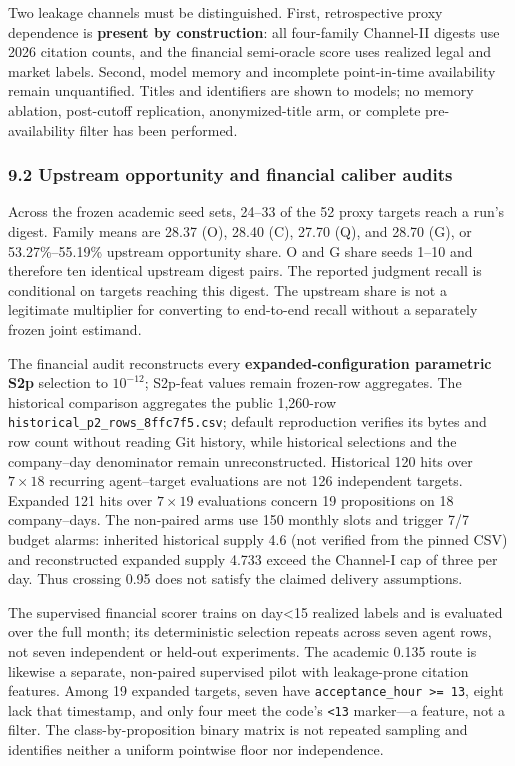 \documentclass[
  11pt]{article}
\begin{document}
Two leakage channels must be distinguished. First, retrospective proxy
dependence is \textbf{present by construction}: all four-family
Channel-II digests use 2026 citation counts, and the financial
semi-oracle score uses realized legal and market labels. Second, model
memory and incomplete point-in-time availability remain unquantified.
Titles and identifiers are shown to models; no memory ablation,
post-cutoff replication, anonymized-title arm, or complete
pre-availability filter has been performed.

\subsubsection{9.2 Upstream opportunity and financial caliber
audits}\label{upstream-opportunity-and-financial-caliber-audits}

Across the frozen academic seed sets, 24--33 of the 52 proxy targets
reach a run's digest. Family means are 28.37 (O), 28.40 (C), 27.70 (Q),
and 28.70 (G), or 53.27\%--55.19\% upstream opportunity share. O and G
share seeds 1--10 and therefore ten identical upstream digest pairs. The
reported judgment recall is conditional on targets reaching this digest.
The upstream share is not a legitimate multiplier for converting to
end-to-end recall without a separately frozen joint estimand.

The financial audit reconstructs every \textbf{expanded-configuration
parametric S2p} selection to \(10^{-12}\); S2p-feat values remain
frozen-row aggregates. The historical comparison aggregates the public
1,260-row \texttt{historical\_p2\_rows\_8ffc7f5.csv}; default
reproduction verifies its bytes and row count without reading Git
history, while historical selections and the company--day denominator
remain unreconstructed. Historical 120 hits over \(7\times18\) recurring
agent--target evaluations are not 126 independent targets. Expanded 121
hits over \(7\times19\) evaluations concern 19 propositions on 18
company--days. The non-paired arms use 150 monthly slots and trigger 7/7
budget alarms: inherited historical supply 4.6 (not verified from the
pinned CSV) and reconstructed expanded supply 4.733 exceed the Channel-I
cap of three per day. Thus crossing 0.95 does not satisfy the claimed
delivery assumptions.

The supervised financial scorer trains on day\textless15 realized labels
and is evaluated over the full month; its deterministic selection
repeats across seven agent rows, not seven independent or held-out
experiments. The academic 0.135 route is likewise a separate, non-paired
supervised pilot with leakage-prone citation features. Among 19 expanded
targets, seven have \texttt{acceptance\_hour\ \textgreater{}=\ 13},
eight lack that timestamp, and only four meet the code's
\texttt{\textless{}13} marker---a feature, not a filter. The
class-by-proposition binary matrix is not repeated sampling and
identifies neither a uniform pointwise floor nor independence.
\end{document}
